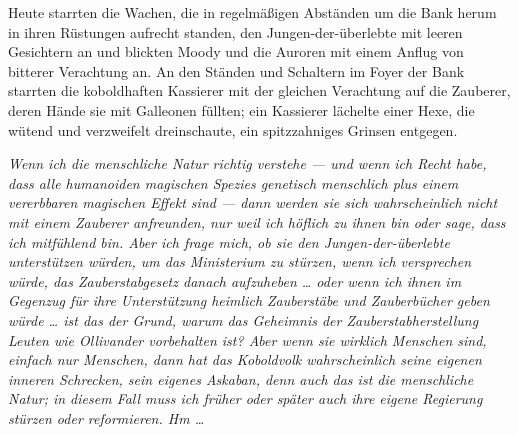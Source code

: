 Heute starrten die Wachen, die in regelmäßigen Abständen um die Bank herum in ihren Rüstungen aufrecht standen, den Jungen-der-überlebte mit leeren Gesichtern an und blickten Moody und die Auroren mit einem Anflug von bitterer Verachtung an. An den Ständen und Schaltern im Foyer der Bank starrten die koboldhaften Kassierer mit der gleichen Verachtung auf die Zauberer, deren Hände sie mit Galleonen füllten; ein Kassierer lächelte einer Hexe, die wütend und verzweifelt dreinschaute, ein spitzzahniges Grinsen entgegen.

\emph{Wenn ich die menschliche Natur richtig verstehe — und wenn ich Recht habe, dass alle humanoiden magischen Spezies genetisch menschlich plus einem vererbbaren magischen Effekt sind — dann werden sie sich wahrscheinlich nicht mit einem Zauberer anfreunden, nur weil ich höflich zu ihnen bin oder sage, dass ich mitfühlend bin. Aber ich frage mich, ob sie den Jungen-der-überlebte unterstützen würden, um das Ministerium zu stürzen, wenn ich versprechen würde, das Zauberstabgesetz danach aufzuheben … oder wenn ich ihnen im Gegenzug für ihre Unterstützung heimlich Zauberstäbe und Zauberbücher geben würde … ist das der Grund, warum das Geheimnis der Zauberstabherstellung Leuten wie Ollivander vorbehalten ist? Aber wenn sie wirklich Menschen sind, einfach nur Menschen, dann hat das Koboldvolk wahrscheinlich seine eigenen inneren Schrecken, sein eigenes Askaban, denn auch das ist die menschliche Natur; in diesem Fall muss ich früher oder später auch ihre eigene Regierung stürzen oder reformieren. Hm …}

